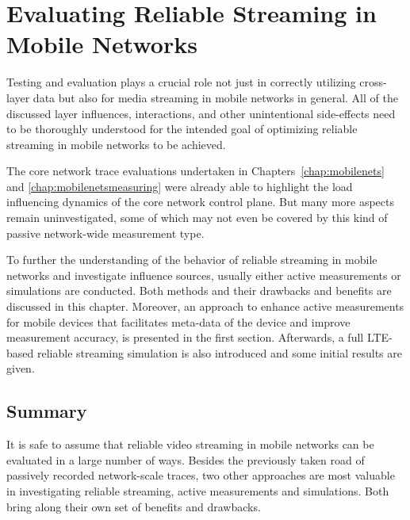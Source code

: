 \chapter{Evaluating Reliable Streaming in Mobile Networks}
\label{chap:mobilestreaming-measurements}

Testing and evaluation plays a crucial role not just in correctly utilizing cross-layer data but also for media streaming in mobile networks in general. All of the discussed layer influences, interactions, and other unintentional side-effects need to be thoroughly understood for the intended goal of optimizing reliable streaming in mobile networks to be achieved.

The core network trace evaluations undertaken in Chapters~\ref{chap:mobilenets} and \ref{chap:mobilenetsmeasuring} were already able to highlight the load influencing dynamics of the core network control plane. But many more aspects remain uninvestigated, some of which may not even be covered by this kind of passive network-wide measurement type.

To further the understanding of the behavior of reliable streaming in mobile networks and investigate influence sources, usually either active measurements or simulations are conducted. Both methods and their drawbacks and benefits are discussed in this chapter. Moreover, an approach to enhance active measurements for mobile devices that facilitates meta-data of the device and improve measurement accuracy, is presented in the first section. Afterwards, a full \gls{LTE}-based reliable streaming simulation is also introduced and some initial results are given.







\section{Summary}

It is safe to assume that reliable video streaming in mobile networks can be evaluated in a large number of ways. Besides the previously taken road of passively recorded network-scale traces, two other approaches are most valuable in investigating reliable streaming, active measurements and simulations. Both bring along their own set of benefits and drawbacks. 

